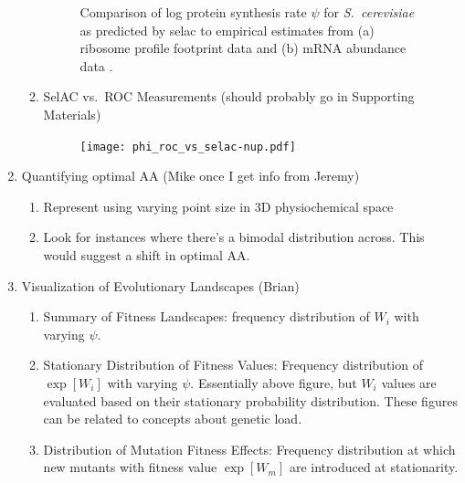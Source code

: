 \documentclass{article}
\begin{document}
\begin{enumerate}
\begin{enumerate}
\begin{figure}[H]
      \qquad
      \caption{Comparison of log protein synthesis rate $\psi$ for \emph{S.~cerevisiae} as predicted by selac to empirical estimates from (a) ribosome profile footprint data \citep{IngoliaEtAl2009} and (b) mRNA abundance data \citep{HolstegeEtAl1998}.
      }
    \end{figure}
  \item SelAC vs.~ROC Measurements (should probably go in Supporting Materials)
    \begin{figure}[H]
      \centering
      \texttt{[image: phi\_roc\_vs\_selac-nup.pdf]}
    \end{figure}
  \end{enumerate}
\item Quantifying optimal AA \label{fig:optAA} (Mike once I get info from Jeremy)
  \begin{enumerate}
  \item Represent using varying point size in 3D physiochemical space
  \item Look for instances where there's a bimodal distribution across.
    This would suggest a shift in optimal AA.
  \end{enumerate}
\item Visualization of Evolutionary Landscapes (Brian)
  \begin{enumerate}
  \item Summary of Fitness Landscapes: frequency distribution of $W_i$ with varying $\psi$. \label{fig:fitnessLandscape}
  \item Stationary Distribution of Fitness Values: Frequency distribution of $\exp[W_i]$ with varying $\psi$. \label{fig:expectedGeneticLoad}
    Essentially above figure, but $W_i$ values are evaluated based on their stationary probability distribution.
    These figures can be related to concepts about genetic load.
  \item Distribution of Mutation Fitness Effects: Frequency distribution at which new mutants with fitness value $\exp[W_m]$ are introduced at stationarity. \label{fig:mutationFitnessEffects}
  \end{enumerate}
\end{enumerate}
\end{document}
